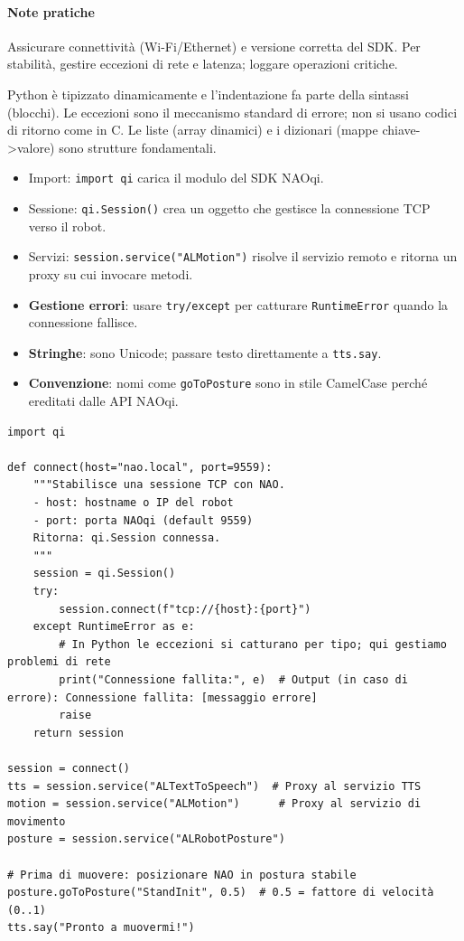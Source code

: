\paragraph{Note pratiche} Assicurare connettività (Wi-Fi/Ethernet) e versione corretta del SDK. Per stabilità, gestire eccezioni di rete e latenza; loggare operazioni critiche.

\begin{tcolorbox}[title=Guida rapida per programmatori non-Python]
Python è tipizzato dinamicamente e l'indentazione fa parte della sintassi (blocchi). Le eccezioni sono il meccanismo standard di errore; non si usano codici di ritorno come in C. Le liste (array dinamici) e i dizionari (mappe chiave->valore) sono strutture fondamentali.

\begin{itemize}
  \item Import: \texttt{import qi} carica il modulo del SDK NAOqi.
  \item Sessione: \texttt{qi.Session()} crea un oggetto che gestisce la connessione TCP verso il robot.
  \item Servizi: \texttt{session.service("ALMotion")} risolve il servizio remoto e ritorna un proxy su cui invocare metodi.
\end{itemize}

\begin{itemize}
  \item \textbf{Gestione errori}: usare \texttt{try/except} per catturare \texttt{RuntimeError} quando la connessione fallisce.
  \item \textbf{Stringhe}: sono Unicode; passare testo direttamente a \texttt{tts.say}.
  \item \textbf{Convenzione}: nomi come \texttt{goToPosture} sono in stile CamelCase perché ereditati dalle API NAOqi.
\end{itemize}
\end{tcolorbox}

\begin{tcolorbox}[title=Connessione commentata passo-passo]
\begin{lstlisting}
import qi

def connect(host="nao.local", port=9559):
    """Stabilisce una sessione TCP con NAO.
    - host: hostname o IP del robot
    - port: porta NAOqi (default 9559)
    Ritorna: qi.Session connessa.
    """
    session = qi.Session()
    try:
        session.connect(f"tcp://{host}:{port}")
    except RuntimeError as e:
        # In Python le eccezioni si catturano per tipo; qui gestiamo problemi di rete
        print("Connessione fallita:", e)  # Output (in caso di errore): Connessione fallita: [messaggio errore]
        raise
    return session

session = connect()
tts = session.service("ALTextToSpeech")  # Proxy al servizio TTS
motion = session.service("ALMotion")      # Proxy al servizio di movimento
posture = session.service("ALRobotPosture")

# Prima di muovere: posizionare NAO in postura stabile
posture.goToPosture("StandInit", 0.5)  # 0.5 = fattore di velocità (0..1)
tts.say("Pronto a muovermi!")
\end{lstlisting}
\end{tcolorbox}

